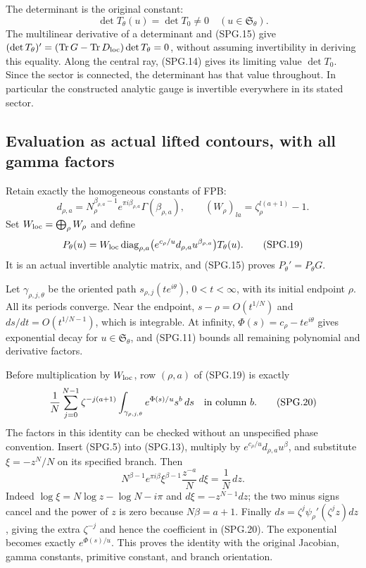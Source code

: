 The determinant is the original constant:
\[
 \det T_\theta(u)=\det T_0\ne0
                 \quad(u\in\mathfrak S_\theta).
 \tag{SPG.17}\label{eq:spg-determinant}
\]
The multilinear derivative of a determinant and (SPG.15) give
\((\det T_\theta)'=(\operatorname{Tr}G-
\operatorname{Tr}D_{\rm loc})\det T_\theta=0\), without assuming
invertibility in deriving this equality. Along the central ray,
(SPG.14) gives its limiting value \(\det T_0\). Since the sector
is connected, the determinant has that value throughout. In
particular the constructed analytic gauge is invertible everywhere
in its stated sector.

\subsection{Evaluation as actual lifted contours, with all gamma factors}

Retain exactly the homogeneous constants of FPB:
\[
 d_{\rho,a}=N_\rho^{\beta_{\rho,a}-1}
           e^{\pi i\beta_{\rho,a}}\Gamma(\beta_{\rho,a}),
 \qquad (W_\rho)_{la}=\zeta_\rho^{l(a+1)}-1.
 \tag{SPG.18}\label{eq:spg-gamma}
\]
Set \(W_{\rm loc}=\bigoplus_\rho W_\rho\) and define
\[
 P_\theta(u)=W_{\rm loc}
    \operatorname{diag}_{\rho,a}
       \bigl(e^{c_\rho/u}d_{\rho,a}u^{\beta_{\rho,a}}\bigr)
                      T_\theta(u).
 \tag{SPG.19}\label{eq:spg-period-matrix}
\]
It is an actual invertible analytic matrix, and (SPG.15) proves
\(P_\theta'=P_\theta G\).

Let \(\gamma_{\rho,j,\theta}\) be the oriented path
\(s_{\rho,j}(t e^{i\theta})\), \(0<t<\infty\), with its
initial endpoint \(\rho\). All its periods converge. Near the
endpoint, \(s-\rho=O(t^{1/N})\) and
\(ds/dt=O(t^{1/N-1})\), which is integrable. At infinity,
\(\Phi(s)=c_\rho-t e^{i\theta}\) gives exponential decay for
\(u\in\mathfrak S_\theta\), and (SPG.11) bounds all remaining
polynomial and derivative factors.

Before multiplication by \(W_{\rm loc}\), row \((\rho,a)\)
of (SPG.19) is exactly
\[
 \frac1N\sum_{j=0}^{N-1}\zeta^{-j(a+1)}
       \int_{\gamma_{\rho,j,\theta}}e^{\Phi(s)/u}s^b\,ds
                 \quad\hbox{in column }b.
 \tag{SPG.20}\label{eq:spg-Fourier-contour}
\]
The factors in this identity can be checked without an unspecified
phase convention. Insert (SPG.5) into (SPG.13), multiply by
\(e^{c_\rho/u}d_{\rho,a}u^\beta\), and substitute
\(\xi=-z^N/N\) on its specified branch. Then
\[
 N^{\beta-1}e^{\pi i\beta}
   \xi^{\beta-1}\frac{z^{-a}}N\,d\xi
          =\frac1N\,dz.
\]
Indeed \(\log\xi=N\log z-\log N-i\pi\) and
\(d\xi=-z^{N-1}dz\); the two minus signs cancel and the power
of \(z\) is zero because \(N\beta=a+1\).
Finally \(ds=\zeta^j\psi_\rho'(\zeta^jz)dz\), giving the
extra \(\zeta^{-j}\) and hence the coefficient in (SPG.20).
The exponential becomes exactly \(e^{\Phi(s)/u}\). This proves
the identity with the original Jacobian, gamma constants, primitive
constant, and branch orientation.


